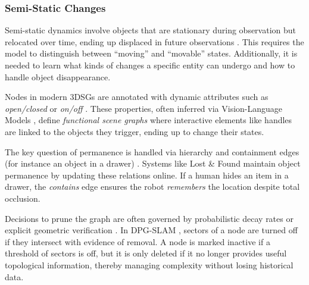 
\subsubsection{Semi-Static Changes}\label{sec:dynamics_representations_objects}
Semi-static dynamics involve objects that are stationary during observation but relocated over time, ending up displaced in future observations \cite{brink_using_2016} \cite{giberna_dynemo-slam_2025}.
This requires the model to distinguish between ``moving'' and ``movable'' states. 
Additionally, it is needed to learn what kinds of changes a specific entity can undergo and how to handle object disappearance. 

Nodes in modern 3DSGs are annotated with dynamic attributes such as \textit{open/closed} or \textit{on/off} \cite{olivastri_multi-modal_2024}. 
These properties, often inferred via Vision-Language Models \cite{shao_large_2025}, define \textit{functional scene graphs} \cite{rotondi_fungraph_2025} \cite{zhang_open-vocabulary_2025} where interactive elements like handles are linked to the objects they trigger, ending up to change their states. 

The key question of permanence is handled via hierarchy and containment edges (for instance an object in a drawer) \cite{behrens_lost_2025} \cite{yan_dynamic_2025}.
Systems like Lost \& Found \cite{behrens_lost_2025} maintain object permanence by updating these relations online. 
If a human hides an item in a drawer, the \textit{contains} edge ensures the robot \textit{remembers} the location despite total occlusion. 

Decisions to prune the graph are often governed by probabilistic decay rates \cite{gomez_object-based_2020} or explicit geometric verification \cite{schmid_khronos_2024}.
In DPG-SLAM \cite{walcott-bryant_dynamic_2012}, sectors of a node are turned off if they intersect with evidence of removal. 
A node is marked inactive if a threshold of sectors is off, but it is only deleted if it no longer provides useful topological information, thereby managing complexity without losing historical data. 

